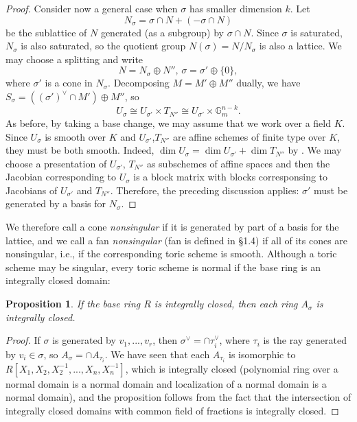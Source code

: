 \documentclass[10pt,a4paper]{book}
\newtheorem{prop}[thm]{Proposition}
\newcommand{\on}{\operatorname}
\begin{document}
\begin{proof}
Consider now a general case when $\sigma$ has smaller dimension $k$. Let
\[
N_\sigma = \sigma\cap N + (-\sigma \cap N)
\]
be the sublattice of $N$ generated (as a subgroup) by $\sigma\cap N$. Since $\sigma$ is
saturated, $N_\sigma$ is also saturated, so the quotient group $N(\sigma) = N/N_\sigma$ is
also a lattice. We may choose a splitting and write
\[
N=N_\sigma \oplus N'' \text{, } \sigma =\sigma'\oplus \{0\},
\]
where $\sigma'$ is a cone in $N_\sigma$. Decomposing $M = M'\oplus M''$ dually, we
have $S_\sigma = ((\sigma')^\vee \cap M')\oplus M''$, so
\[
U_\sigma \cong U_{\sigma'}\times T_{N''} \cong U_{\sigma'}\times \mathbb{G}_m^{n-k}.
\]
As before, by taking a base change, we may assume that we work over a field $K$. Since $U_\sigma$ is smooth over $K$ and $U_{\sigma'}$,$T_{N''}$ are affine schemes of finite type over $K$, they must be both smooth.
Indeed, $\on{dim} U_\sigma = \on{dim}U_{\sigma'}+\on{dim}T_{N''}$ by \cite[Prop.~5.37]{gortz2010algebraic}. We may choose a presentation of $U_{\sigma'}$, $T_{N''}$ as subschemes of affine spaces and then the Jacobian corresponding to $U_\sigma$ is a block matrix with blocks corresponsing to Jacobians of $U_{\sigma'}$ and $T_{N''}$. Therefore, the preceding discussion applies: $\sigma'$ must be generated by a basis for $N_\sigma$.
\end{proof}

We therefore call a cone \textit{nonsingular} if it is generated by part of a basis for the lattice, and we call a fan \textit{nonsingular} (fan is defined in \S 1.4) if all of its cones
are nonsingular, i.e., if the corresponding toric scheme is smooth. Although a toric scheme may be singular, every toric scheme is normal if the base ring is an integrally closed domain:

\begin{prop} If the base ring $R$ is integrally closed, then each ring $A_\sigma$ is integrally closed.
\end{prop}
\begin{proof}
If $\sigma$ is generated by $v_1,...,v_r$, then $\sigma^\vee = \cap \tau_i^\vee$, where
$\tau_i$ is the ray generated by $v_i\in \sigma$, so $A_\sigma = \cap A_{\tau_i}$. We have seen that each $A_{\tau_i}$ is isomorphic to $R[X_1,X_2, X_2^{-1}, ..., X_n, X_n^{-1}]$, which is integrally closed (polynomial ring over a normal domain is a normal domain and localization of a normal domain is a normal domain), and the proposition follows from the fact that the intersection of integrally closed domains with common field of fractions is integrally closed.
\end{proof}




\end{document}
